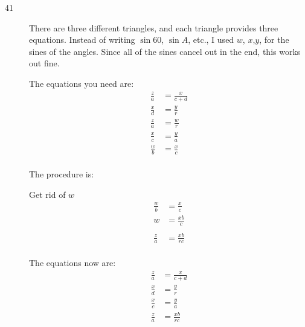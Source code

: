 \documentclass{exam}
\begin{document}
  \begin{description}
    \item[41]

      There are three different triangles, and each triangle provides three equations.  Instead of writing $\sin 60$,
      $\sin A$, etc., I used $w$, $x$,$y$, for the sines of the angles.  Since all of the sines cancel out in the end,
      this works out fine.

      The equations you need are:
      \begin{align*}
        \frac{z}{a} &= \frac{x}{c + d} \\
        \frac{x}{d} &= \frac{y}{r} \\
        \frac{z}{a} &= \frac{w}{r} \\
        \frac{x}{c} &= \frac{y}{a} \\
        \frac{w}{b} &= \frac{x}{c} \\
      \end{align*}

      The procedure is:

      Get rid of $w$
      \begin{align*}
        \frac{w}{b} & = \frac{x}{c} \\
        w           & = \frac{xb}{c} \\
        \\
        \frac{z}{a} & = \frac{xb}{rc} \\
      \end{align*}

      The equations now are:
      \begin{align*}
        \frac{z}{a} & = \frac{x}{c + d} \\
        \frac{x}{d} & = \frac{y}{r} \\
        \frac{x}{c} & = \frac{y}{a} \\
        \frac{z}{a} & = \frac{xb}{rc} \\
      \end{align*}


\end{description}
\end{document}
